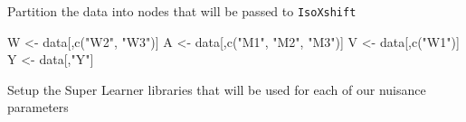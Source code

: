\documentclass[
]{article}
\newenvironment{Shaded}{\begin{snugshade}}{\end{snugshade}}
\newcommand{\FunctionTok}[1]{\textcolor[rgb]{0.00,0.00,0.00}{#1}}
\newcommand{\NormalTok}[1]{#1}
\newcommand{\OtherTok}[1]{\textcolor[rgb]{0.56,0.35,0.01}{#1}}
\newcommand{\SpecialCharTok}[1]{\textcolor[rgb]{0.00,0.00,0.00}{#1}}
\newcommand{\StringTok}[1]{\textcolor[rgb]{0.31,0.60,0.02}{#1}}
\begin{document}
\begin{Shaded}
\end{Shaded}

Partition the data into nodes that will be passed to \texttt{IsoXshift}

\begin{Shaded}
\begin{Highlighting}[]

\NormalTok{W }\OtherTok{\textless{}{-}}\NormalTok{ data[,}\FunctionTok{c}\NormalTok{(}\StringTok{"W2"}\NormalTok{, }\StringTok{"W3"}\NormalTok{)]}
\NormalTok{A }\OtherTok{\textless{}{-}}\NormalTok{ data[,}\FunctionTok{c}\NormalTok{(}\StringTok{"M1"}\NormalTok{, }\StringTok{"M2"}\NormalTok{, }\StringTok{"M3"}\NormalTok{)]}
\NormalTok{V }\OtherTok{\textless{}{-}}\NormalTok{ data[,}\FunctionTok{c}\NormalTok{(}\StringTok{"W1"}\NormalTok{)]}
\NormalTok{Y }\OtherTok{\textless{}{-}}\NormalTok{ data[,}\StringTok{"Y"}\NormalTok{]}
\end{Highlighting}
\end{Shaded}

Setup the Super Learner libraries that will be used for each of our
nuisance parameters
\end{document}
